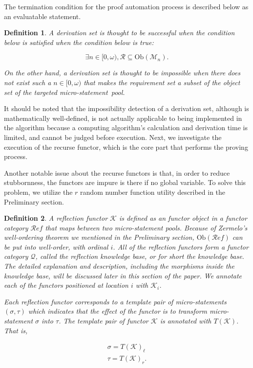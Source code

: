 \documentclass{aims}
\numberwithin{equation}{section}
\newtheorem{definition}{Definition}	%
\numberwithin{theorem}{section}	%
\numberwithin{axiom}{section}	%
\numberwithin{definition}{section}	%
\begin{document}
	The termination condition for the proof automation process is described below as an evaluatable statement. 
	
	\begin{definition}
		A derivation set is thought to be{ successful} when the condition below is satisfied when the condition below is true:
		
		\begin{equation}
			\exists n\in [0,\omega ), \mathcal{R}\subseteq \text{Ob}\left(\mathcal{M}_n\right).
		\end{equation}
		
		On the other hand, a derivation set is thought to be{ impossible} when there does not exist such a \(n\in [0,\omega )\) that makes the requirement set a subset of the object set of the targeted micro-statement~pool.
	\end{definition}
	
	It should be noted that the impossibility detection of a derivation set, although is mathematically well-defined, is not actually applicable to being implemented in the algorithm because a computing algorithm{'}s calculation and derivation time is limited, and cannot be judged before execution. Next, we investigate the execution of the recurse functor, which is the core part that performs the proving process.
	
	Another notable issue about the recurse functors is that, in order to reduce stubbornness, the functors are impure is there if no global variable. To solve this problem, we utilize the \(\mathit{r}\) random number function utility described in the Preliminary section.
	
	\begin{definition}
		A{ reflection functor} \(\mathcal{K}\) is defined as an functor object in a functor category \(\mathcal{R}\mathit{e}\mathit{f}\) that maps between two micro-statement pools. Because of Zermelo{'}s well-ordering theorem we mentioned in the Preliminary section, \(\text{Ob}(\mathcal{R}\mathit{e}\mathit{f})\) can be put into well-order, with ordinal \(i\). All of the reflection functors form a functor category \(\mathcal{Q}\), called the{ reflection knowledge base}, or for short the{ knowledge base}. The detailed explanation and description, including the morphisms inside the knowledge base, will be discussed later in this section of the paper. We annotate each of the functors positioned at location \(i\) with \(\mathcal{K}_i\).
		
		Each reflection functor corresponds to a { template pair} of micro-statements \((\sigma ,\tau )\) which indicates that the effect of the functor is to transform micro-statement \(\sigma\) into $\tau $. The template pair of functor \(\mathcal{K}\) is annotated with \(T(\mathcal{K})\). That
		is,
		
		\begin{equation}
			\begin{gathered}
				\sigma =T(\mathcal{K})_{\ell }\\
				\tau =T(\mathcal{K})_{\mathit{r}}
.			\end{gathered}
		\end{equation}
	\end{definition}
	
\end{document}
